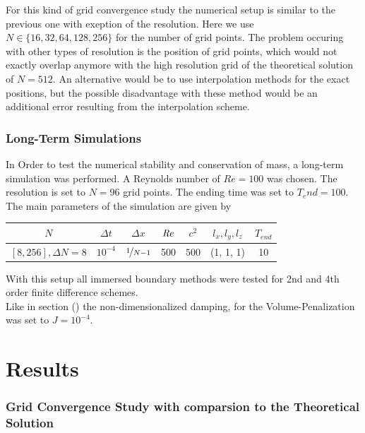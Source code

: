 For this kind of grid convergence study the numerical setup is similar to the previous one with exeption of the resolution.
Here we use $N\in\{16, 32, 64, 128, 256\}$ for the number of grid points.
The problem occuring with other types of resolution is the position of grid points, which would not exactly overlap anymore with
the high resolution grid  of the theoretical solution of $N=512$.
An alternative would be to use interpolation methods for the exact positions, but the possible disadvantage with these method
would be an additional error resulting from the interpolation scheme.\\

\subsubsection{Long-Term Simulations}

In Order to test the  numerical stability and conservation of mass, a long-term simulation was performed.
A Reynolds number of $Re=100$ was chosen. The resolution is set to $N=96$ grid points.
The ending time was set to $T_end=100$.
The main parameters of the simulation are  given by

\begin{center}
\vspace*{0.7ex}
\begin{tabular}{c|c|c|c|c|c|c }
 $ N  $                   & $\Delta t$ & $\Delta x$            & $\mbox{\textit{Re}}$  & $c^2$   & $l_x, l_y, l_z$ & $T_{end}$\\
\hline
 $[8, 256], \Delta N = 8 $& $10^{-4}$ & $\nicefrac{1}{N - 1}$ & 500     & $500$   & (1, 1, 1)       & 10\\
\end{tabular}
\vspace*{0.7ex}
\end{center}

With this setup all immersed boundary methods were tested for 2nd and 4th order finite difference schemes.\\
Like in section () the non-dimensionalized damping, for the Volume-Penalization was set to $J=10^{-4}$.

\clearpage

\section{Results}

\subsubsection{Grid Convergence Study with comparsion to the Theoretical Solution}

